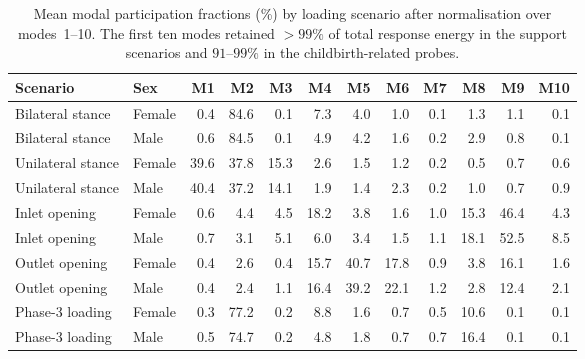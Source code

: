 \documentclass[openacc]{rsproca_new}
\begin{document}
\begin{table}[p]
\centering
\caption{Mean modal participation fractions (\%) by loading scenario after normalisation over modes~1--10. The first ten modes retained $>99\%$ of total response energy in the support scenarios and $91$--$99\%$ in the childbirth-related probes.}
\label{tab:loadcases}
\begin{tabular}{llrrrrrrrrrr}
\toprule
Scenario & Sex & M1 & M2 & M3 & M4 & M5 & M6 & M7 & M8 & M9 & M10 \\
\midrule
Bilateral stance & Female & 0.4 & 84.6 & 0.1 & 7.3 & 4.0 & 1.0 & 0.1 & 1.3 & 1.1 & 0.1 \\
Bilateral stance & Male   & 0.6 & 84.5 & 0.1 & 4.9 & 4.2 & 1.6 & 0.2 & 2.9 & 0.8 & 0.1 \\
Unilateral stance & Female & 39.6 & 37.8 & 15.3 & 2.6 & 1.5 & 1.2 & 0.2 & 0.5 & 0.7 & 0.6 \\
Unilateral stance & Male   & 40.4 & 37.2 & 14.1 & 1.9 & 1.4 & 2.3 & 0.2 & 1.0 & 0.7 & 0.9 \\
Inlet opening & Female & 0.6 & 4.4 & 4.5 & 18.2 & 3.8 & 1.6 & 1.0 & 15.3 & 46.4 & 4.3 \\
Inlet opening & Male   & 0.7 & 3.1 & 5.1 & 6.0 & 3.4 & 1.5 & 1.1 & 18.1 & 52.5 & 8.5 \\
Outlet opening & Female & 0.4 & 2.6 & 0.4 & 15.7 & 40.7 & 17.8 & 0.9 & 3.8 & 16.1 & 1.6 \\
Outlet opening & Male   & 0.4 & 2.4 & 1.1 & 16.4 & 39.2 & 22.1 & 1.2 & 2.8 & 12.4 & 2.1 \\
Phase-3 loading & Female & 0.3 & 77.2 & 0.2 & 8.8 & 1.6 & 0.7 & 0.5 & 10.6 & 0.1 & 0.1 \\
Phase-3 loading & Male   & 0.5 & 74.7 & 0.2 & 4.8 & 1.8 & 0.7 & 0.7 & 16.4 & 0.1 & 0.1 \\
\bottomrule
\end{tabular}
\end{table}
\end{document}
